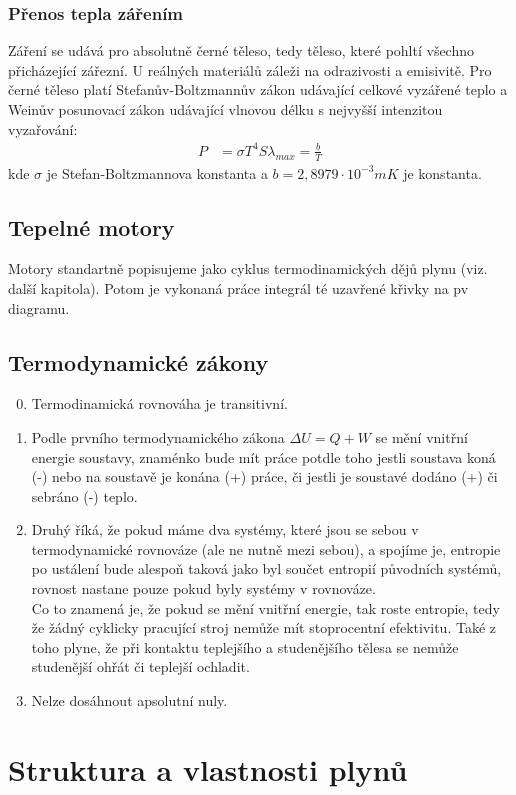 \documentclass[titlepage]{book}
\begin{document}
\subsection{Přenos tepla zářením}
Záření se udává pro absolutně černé těleso, tedy těleso, které pohltí všechno přicházející zářezní. U reálných materiálů záleži na odrazivosti a emisivitě. Pro černé těleso platí Stefanův-Boltzmannův zákon udávající celkové vyzářené teplo a Weinův posunovací zákon udávající vlnovou délku s nejvyšší intenzitou vyzařování:
\begin{align}
P &= \sigma T^4 S
\lambda_{max} = \frac{b}{T}
\end{align}
kde $\sigma$ je Stefan-Boltzmannova konstanta a $b = 2,8979 \cdot 10^{-3} mK$ je konstanta.
\section{Tepelné motory}
Motory standartně popisujeme jako cyklus termodinamických dějů plynu (viz. další kapitola). Potom je vykonaná práce integrál té uzavřené křivky na pv diagramu.
\section{Termodynamické zákony}
\begin{enumerate}
\setcounter{enumi}{-1}
\item Termodinamická rovnováha je transitivní.
\item Podle prvního termodynamického zákona $\Delta U = Q + W$ se mění vnitřní energie soustavy, znaménko bude mít práce potdle toho jestli soustava koná (-) nebo na soustavě je konána (+) práce, či jestli je soustavé dodáno (+) či sebráno (-) teplo.
\item Druhý říká, že pokud máme dva systémy, které jsou se sebou v termodynamické rovnováze (ale ne nutně mezi sebou), a spojíme je, entropie po ustálení bude alespoň taková jako byl součet entropií původních systémů, rovnost nastane pouze pokud byly systémy v rovnováze.\\
Co to znamená je, že pokud se mění vnitřní energie, tak roste entropie, tedy že žádný cyklicky pracující stroj nemůže mít stoprocentní efektivitu. Také z toho plyne, že při kontaktu teplejšího a studenějšího tělesa se nemůže studenější ohřát či teplejší ochladit.
\item Nelze dosáhnout apsolutní nuly.
\end{enumerate}
\chapter{Struktura a vlastnosti plynů}
\end{document}
